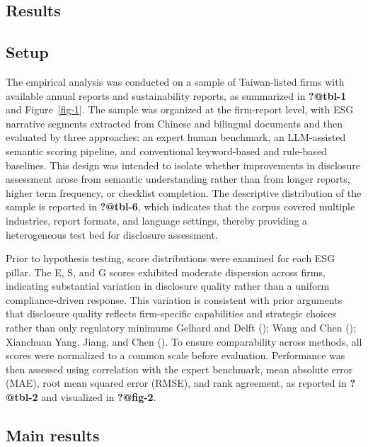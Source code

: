 \documentclass[
  12pt,
]{article}
\begin{document}
\subsection{Results}\label{results-1}

\subsection{Setup}\label{setup}

The empirical analysis was conducted on a sample of Taiwan-listed firms
with available annual reports and sustainability reports, as summarized
in \textbf{?@tbl-1} and Figure~\ref{fig-1}. The sample was organized at
the firm-report level, with ESG narrative segments extracted from
Chinese and bilingual documents and then evaluated by three approaches:
an expert human benchmark, an LLM-assisted semantic scoring pipeline,
and conventional keyword-based and rule-based baselines. This design was
intended to isolate whether improvements in disclosure assessment arose
from semantic understanding rather than from longer reports, higher term
frequency, or checklist completion. The descriptive distribution of the
sample is reported in \textbf{?@tbl-6}, which indicates that the corpus
covered multiple industries, report formats, and language settings,
thereby providing a heterogeneous test bed for disclosure assessment.

Prior to hypothesis testing, score distributions were examined for each
ESG pillar. The E, S, and G scores exhibited moderate dispersion across
firms, indicating substantial variation in disclosure quality rather
than a uniform compliance-driven response. This variation is consistent
with prior arguments that disclosure quality reflects firm-specific
capabilities and strategic choices rather than only regulatory minimums
Gelhard and Delft (); Wang and Chen
(); Xianchuan Yang, Jiang, and Chen
(). To ensure comparability across methods,
all scores were normalized to a common scale before evaluation.
Performance was then assessed using correlation with the expert
benchmark, mean absolute error (MAE), root mean squared error (RMSE),
and rank agreement, as reported in \textbf{?@tbl-2} and visualized in
\textbf{?@fig-2}.

\subsection{Main results}\label{main-results}
\end{document}
